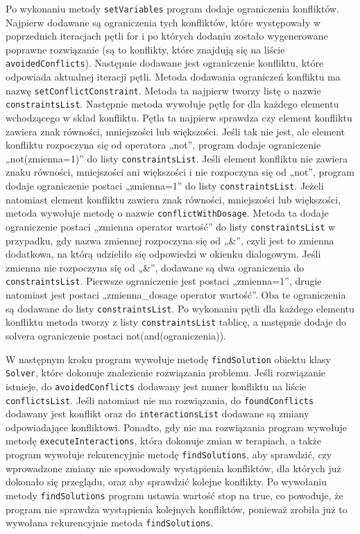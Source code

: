 Po wykonaniu metody \texttt{setVariables} program dodaje ograniczenia konfliktów. Najpierw dodawane są ograniczenia tych konfliktów, które występowały w poprzednich iteracjach pętli for i po których dodaniu zostało wygenerowane poprawne rozwiązanie (są to konflikty, które znajdują się na liście \texttt{avoidedConflicts}). Następnie dodawane jest ograniczenie konfliktu, które odpowiada aktualnej iteracji pętli. Metoda dodawania ograniczeń konfliktu ma nazwę \texttt{setConflictConstraint}. Metoda ta najpierw tworzy listę o nazwie \texttt{constraintsList}. Następnie metoda wywołuje pętlę for dla każdego elementu wchodzącego w skład konfliktu. Pętla ta najpierw sprawdza czy element konfliktu zawiera znak równości, mniejszości lub większości. Jeśli tak nie jest, ale element konfliktu rozpoczyna się od operatora „not”, program dodaje ograniczenie „not(zmienna=1)” do listy \texttt{constraintsList}. Jeśli element konfliktu nie zawiera znaku równości, mniejszości ani większości i nie rozpoczyna się od „not”, program dodaje ograniczenie postaci „zmienna=1” do listy \texttt{constraintsList}. Jeżeli natomiast element konfliktu zawiera znak równości, mniejszości lub większości, metoda wywołuje metodę o nazwie \texttt{conflictWithDosage}. Metoda ta dodaje ograniczenie postaci „zmienna operator wartość” do listy \texttt{constraintsList} w przypadku, gdy nazwa zmiennej rozpoczyna się od „\&”, czyli jest to zmienna dodatkowa, na którą udzieliło się odpowiedzi w okienku dialogowym. Jeśli zmienna nie rozpoczyna się od „\&”, dodawane są dwa ograniczenia do \texttt{constraintsList}. Pierwsze ograniczenie jest postaci „zmienna=1”, drugie natomiast jest postaci „zmienna\_dosage operator wartość”. Oba te ograniczenia są dodawane do listy \texttt{constraintsList}. Po wykonaniu pętli dla każdego elementu konfliktu metoda tworzy z listy \texttt{constraintsList} tablicę, a następnie dodaje do solvera ograniczenie postaci not(and(ograniczenia)). 

W następnym kroku program wywołuje metodę \texttt{findSolution} obiektu klasy \texttt{Solver}, które dokonuje znalezienie rozwiązania problemu. Jeśli rozwiązanie istnieje, do \texttt{avoidedConflicts} dodawany jest numer konfliktu na liście \texttt{conflictsList}. Jeśli natomiast nie ma rozwiązania, do \texttt{foundConflicts} dodawany jest konflikt oraz do \texttt{interactionsList} dodawane są zmiany odpowiadające konfliktowi. Ponadto, gdy nie ma rozwiązania program wywołuje metodę \texttt{execute\-Interactions}, która dokonuje zmian w terapiach, a także program wywołuje rekurencyjnie metodę \texttt{findSolutions}, aby sprawdzić, czy wprowadzone zmiany nie spowodowały wystąpienia konfliktów, dla których już dokonało się przeglądu, oraz aby sprawdzić kolejne konflikty. Po wywołaniu metody \texttt{findSolutions} program ustawia wartość stop na true, co powoduje, że program nie sprawdza wystąpienia kolejnych konfliktów, ponieważ zrobiła już to wywołana rekurencyjnie metoda \texttt{findSolutions}. 


